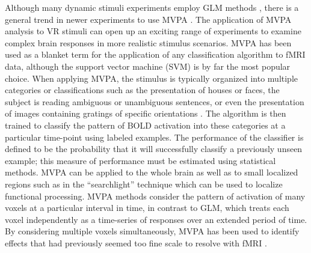 \documentclass[review,1p,authoryear]{elsarticle}
\begin{document}
Although many dynamic stimuli experiments employ GLM methods \citep{Maguire1998,Calhoun2002,King2006,Mathiak2006,Spiers2007a}, there is a general trend in newer experiments to use MVPA \citep{Hassabis2009,Chadwick2010}. The application of MVPA analysis to VR stimuli can open up an exciting range of experiments to examine complex brain responses in more realistic stimulus scenarios.
MVPA has been used as a blanket term for the application of any classification algorithm to fMRI data, although the support vector machine (SVM) is by far the most popular choice.
When applying MVPA, the stimulus is typically organized into multiple categories or classifications such as the presentation of houses or faces, the subject is reading ambiguous or unambiguous sentences, or even the presentation of images containing gratings of specific orientations \citep{Haxby2001,Mitchell2003,Haynes2006}.
The algorithm is then trained to classify the pattern of BOLD activation into these categories at a particular time-point using labeled examples.
The performance of the classifier is defined to be the probability that it will successfully classify a previously unseen example;
this measure of performance must be estimated using statistical methods.
MVPA can be applied to the whole brain as well as to small localized regions such as in the ``searchlight'' technique \citep{Kriegeskorte2006} which can be used to localize functional processing.
MVPA methods consider the pattern of activation of many voxels at a particular interval in time, in contrast to GLM, which treats each voxel independently as a time-series of responses over an extended period of time.
By considering multiple voxels simultaneously, MVPA has been used to identify effects that had previously seemed too fine scale to resolve with fMRI \citep{Kamitani2005,Hassabis2009}.
\end{document}
